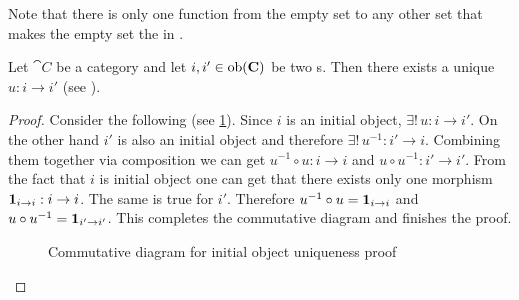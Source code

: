 \begin{example}
\label{ex:set_initial_object}
Note that there is only one function from the empty set to any other set
\cite{bib:proofwiki:Empty_Mapping_is_Unique} that makes the empty set
the  in .
\end{example}

\begin{theorem}
\label{thm:initial_object_unique}
Let $\cat{C}$ be a category and let $i, i' \in \mathrm{ob}(\mathbf{C})$ be two
s. Then there exists a unique
 $u: i \to i'$ (see
).
\begin{proof}
Consider the following  (see
\cref{fig:initial_object_unique}). Since $i$ is an initial object,
$\exists! \, u: i \to i'$. On the other hand $i'$ is also an initial object
and therefore $\exists! \, u^{-1}: i' \to i$. Combining them together
via composition we can get $u^{-1} \circ u: i \to i$ and $u \circ
u^{-1}: i' \to i'$. From the fact that $i$ is initial object one can
get that there exists
only one morphism $\mathbf{1}_{ i \to i }: i \to i$. The same is true for $i'$.
Therefore $u^{-1} \circ u = \mathbf{1}_{ i \to i }$ and $u \circ u^{-1} = \mathbf{1}_{ i' \to i' }$.
This completes the commutative diagram and finishes the proof.
\begin{figure}
  \centering
  \caption{Commutative diagram for initial object uniqueness  proof}
  \label{fig:initial_object_unique}
\end{figure}
\end{proof}
\end{theorem}

